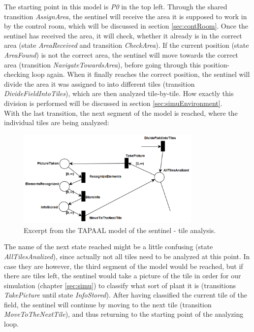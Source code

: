 \documentclass[english]{lni}
\begin{document}
The starting point in this model is \textit{P0} in the top left. Through the shared transition \textit{AssignArea}, the sentinel will receive the area it is supposed to work in by the control room, which will be discussed in section \ref{sec:contRoom}. Once the sentinel has received the area, it will check, whether it already is in the correct area (state \textit{AreaReceived} and transition \textit{CheckArea}). If the current position (state \textit{AreaFound}) is not the correct area, the sentinel will move towards the correct area (transition \textit{NavigateTowardsArea}), before going through this position-checking loop again. When it finally reaches the correct position, the sentinel will divide the area it was assigned to into different tiles (transition \textit{DivideFieldIntoTiles}), which are then analyzed tile-by-tile. How exactly this division is performed will be discussed in section \ref{sec:simuEnvironment}.\\
With the last transition, the next segment of the model is reached, where the individual tiles are being analyzed:

\begin{figure}[H]
    \centering
    \includegraphics[width = 9cm]{img/sentinel_part2.png}
    \caption{Excerpt from the TAPAAL model of the sentinel - tile analysis.}
    \label{fig:sentinel_2}
\end{figure}
The name of the next state reached might be a little confusing (state \textit{AllTilesAnalized}), since actually not all tiles need to be analyzed at this point. In case they are however, the third segment of the model would be reached, but if there are tiles left, the sentinel would take a picture of the tile in order for our simulation (chapter \ref{sec:simu}) to classify what sort of plant it is (transitions \textit{TakePicture} until state \textit{InfoStored}). After having classified the current tile of the field, the sentinel will continue by moving to the next tile (transition \textit{MoveToTheNextTile}), and thus returning to the starting point of the analyzing loop.\\
\end{document}
